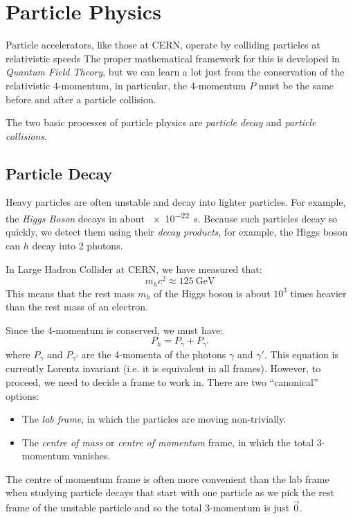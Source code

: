 \documentclass[../main.tex]{subfiles}
\begin{document}
\section{Particle Physics}
Particle accelerators, like those at CERN, operate by colliding particles at relativistic speeds
The proper mathematical framework for this is developed in \textit{Quantum Field Theory}, but we can learn a lot just from the conservation of the relativistic 4-momentum, in particular, the 4-momentum $P$ must be the same before and after a particle collision.

The two basic processes of particle physics are \textit{particle decay} and \textit{particle collisions}.
\subsection{Particle Decay}
Heavy particles are often unstable and decay into lighter particles.
For example, the \textit{Higgs Boson} decays in about \qty{e-22}{\second}.
Because such particles decay so quickly, we detect them using their \textit{decay products}, for example, the Higgs boson can $h$ decay into 2 photons.

In Large Hadron Collider at CERN, we have measured that:
\[
  m_hc^2 \approx \qty{125}{\giga\electronvolt}
\]
This means that the rest mass $m_h$ of the Higgs boson is about $10^{3}$ times heavier than the rest mass of an electron.

Since the 4-momentum is conserved, we must have:
\[
  P_{h} = P_{\gamma} + P_{\gamma'}
\]
where $P_{\gamma}$ and $P_{\gamma'}$ are the 4-momenta of the photons $\gamma$ and $\gamma'$.
This equation is currently Lorentz invariant (i.e. it is equivalent in all frames).
However, to proceed, we need to decide a frame to work in.
There are two ``canonical'' options:
\begin{itemize}
  \item The \textit{lab frame}, in which the particles are moving non-trivially.
  \item The \textit{centre of mass} or \textit{centre of momentum} frame, in which the total 3-momentum vanishes.
\end{itemize}
The centre of momentum frame is often more convenient than the lab frame when studying particle decays that start with one particle as we pick the rest frame of the unstable particle and so the total 3-momentum is just $\vec{0}$.
\end{document}

